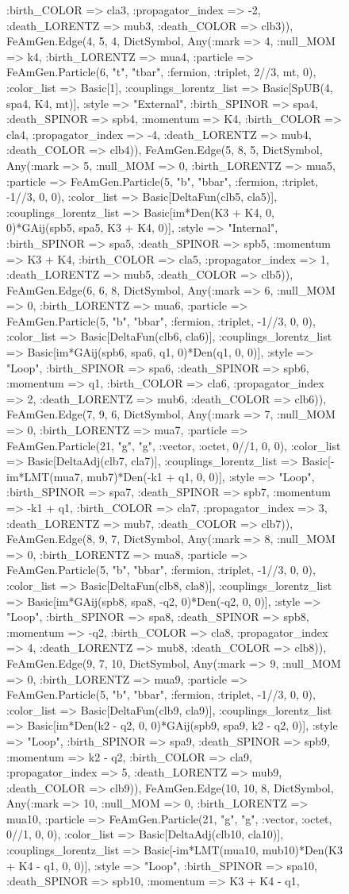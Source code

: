 \documentclass{revtex4}
\begin{document}
\begin{figure}[!htb]
\begin{center}
{:birth_COLOR => cla3, :propagator_index => -2, :death_LORENTZ => mub3, :death_COLOR => clb3)), FeAmGen.Edge(4, 5, 4, Dict{Symbol, Any}(:mark => 4, :null_MOM => k4, :birth_LORENTZ => mua4, :particle => FeAmGen.Particle(6, "t", "tbar", :fermion, :triplet, 2//3, mt, 0), :color_list => Basic[1], :couplings_lorentz_list => Basic[SpUB(4, spa4, K4, mt)], :style => "External", :birth_SPINOR => spa4, :death_SPINOR => spb4, :momentum => K4, :birth_COLOR => cla4, :propagator_index => -4, :death_LORENTZ => mub4, :death_COLOR => clb4)), FeAmGen.Edge(5, 8, 5, Dict{Symbol, Any}(:mark => 5, :null_MOM => 0, :birth_LORENTZ => mua5, :particle => FeAmGen.Particle(5, "b", "bbar", :fermion, :triplet, -1//3, 0, 0), :color_list => Basic[DeltaFun(clb5, cla5)], :couplings_lorentz_list => Basic[im*Den(K3 + K4, 0, 0)*GAij(spb5, spa5, K3 + K4, 0)], :style => "Internal", :birth_SPINOR => spa5, :death_SPINOR => spb5, :momentum => K3 + K4, :birth_COLOR => cla5, :propagator_index => 1, :death_LORENTZ => mub5, :death_COLOR => clb5)), FeAmGen.Edge(6, 6, 8, Dict{Symbol, Any}(:mark => 6, :null_MOM => 0, :birth_LORENTZ => mua6, :particle => FeAmGen.Particle(5, "b", "bbar", :fermion, :triplet, -1//3, 0, 0), :color_list => Basic[DeltaFun(clb6, cla6)], :couplings_lorentz_list => Basic[im*GAij(spb6, spa6, q1, 0)*Den(q1, 0, 0)], :style => "Loop", :birth_SPINOR => spa6, :death_SPINOR => spb6, :momentum => q1, :birth_COLOR => cla6, :propagator_index => 2, :death_LORENTZ => mub6, :death_COLOR => clb6)), FeAmGen.Edge(7, 9, 6, Dict{Symbol, Any}(:mark => 7, :null_MOM => 0, :birth_LORENTZ => mua7, :particle => FeAmGen.Particle(21, "g", "g", :vector, :octet, 0//1, 0, 0), :color_list => Basic[DeltaAdj(clb7, cla7)], :couplings_lorentz_list => Basic[-im*LMT(mua7, mub7)*Den(-k1 + q1, 0, 0)], :style => "Loop", :birth_SPINOR => spa7, :death_SPINOR => spb7, :momentum => -k1 + q1, :birth_COLOR => cla7, :propagator_index => 3, :death_LORENTZ => mub7, :death_COLOR => clb7)), FeAmGen.Edge(8, 9, 7, Dict{Symbol, Any}(:mark => 8, :null_MOM => 0, :birth_LORENTZ => mua8, :particle => FeAmGen.Particle(5, "b", "bbar", :fermion, :triplet, -1//3, 0, 0), :color_list => Basic[DeltaFun(clb8, cla8)], :couplings_lorentz_list => Basic[im*GAij(spb8, spa8, -q2, 0)*Den(-q2, 0, 0)], :style => "Loop", :birth_SPINOR => spa8, :death_SPINOR => spb8, :momentum => -q2, :birth_COLOR => cla8, :propagator_index => 4, :death_LORENTZ => mub8, :death_COLOR => clb8)), FeAmGen.Edge(9, 7, 10, Dict{Symbol, Any}(:mark => 9, :null_MOM => 0, :birth_LORENTZ => mua9, :particle => FeAmGen.Particle(5, "b", "bbar", :fermion, :triplet, -1//3, 0, 0), :color_list => Basic[DeltaFun(clb9, cla9)], :couplings_lorentz_list => Basic[im*Den(k2 - q2, 0, 0)*GAij(spb9, spa9, k2 - q2, 0)], :style => "Loop", :birth_SPINOR => spa9, :death_SPINOR => spb9, :momentum => k2 - q2, :birth_COLOR => cla9, :propagator_index => 5, :death_LORENTZ => mub9, :death_COLOR => clb9)), FeAmGen.Edge(10, 10, 8, Dict{Symbol, Any}(:mark => 10, :null_MOM => 0, :birth_LORENTZ => mua10, :particle => FeAmGen.Particle(21, "g", "g", :vector, :octet, 0//1, 0, 0), :color_list => Basic[DeltaAdj(clb10, cla10)], :couplings_lorentz_list => Basic[-im*LMT(mua10, mub10)*Den(K3 + K4 - q1, 0, 0)], :style => "Loop", :birth_SPINOR => spa10, :death_SPINOR => spb10, :momentum => K3 + K4 - q1, }
\end{center}
\end{figure}
\end{document}
